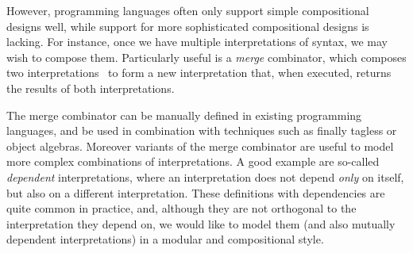 However, programming languages often only support simple compositional designs
well, while support for more sophisticated compositional designs is lacking.
For instance, once we have multiple interpretations of syntax, we may wish to
compose them. Particularly useful is a \emph{merge} combinator,
which composes two interpretations~\cite{oliveira2012extensibility,
oliveira2013feature, rendel14attributes} to form a new interpretation that,
when executed, returns the results of both interpretations. 

% 

The merge combinator can be manually defined in existing programming languages,
and be used in combination with techniques such as finally tagless or object
algebras. Moreover variants of the merge combinator are useful to
model more complex combinations
of interpretations. A good example are so-called \emph{dependent} interpretations,
where an interpretation does not depend \emph{only} on itself, but also on 
a different interpretation. These definitions with dependencies are quite
common in practice, and, although they are not orthogonal to the interpretation they
depend on, we would like to model them (and also mutually dependent interpretations)
in a modular and compositional style.




